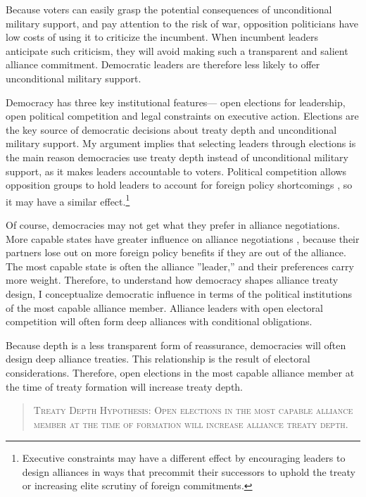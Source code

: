 \documentclass[12pt]{article}
\begin{document}
Because voters can easily grasp the potential consequences of unconditional military support, and pay attention to the risk of war, opposition politicians have low costs of using it to criticize the incumbent. 
When incumbent leaders anticipate such criticism, they will avoid making such a transparent and salient alliance commitment.
Democratic leaders are therefore less likely to offer unconditional military support. 


Democracy has three key institutional features--- open elections for leadership, open political competition and legal constraints on executive action. 
Elections are the key source of democratic decisions about treaty depth and unconditional military support. 
My argument implies that selecting leaders through elections is the main reason democracies use treaty depth instead of unconditional military support, as it makes leaders accountable to voters. 
Political competition allows opposition groups to hold leaders to account for foreign policy shortcomings \citep{PotterBaum2014}, so it may have a similar effect.\footnote{Executive constraints may have a different effect by encouraging leaders to design alliances in ways that precommit their successors to uphold the treaty or increasing elite scrutiny of foreign commitments.} 


Of course, democracies may not get what they prefer in alliance negotiations. 
More capable states have greater influence on alliance negotiations \citep{Mattes2012}, because their partners lose out on more foreign policy benefits if they are out of the alliance.
The most capable state is often the alliance ''leader,'' and their preferences carry more weight. 
Therefore, to understand how democracy shapes alliance treaty design, I conceptualize democratic influence in terms of the political institutions of the most capable alliance member.
Alliance leaders with open electoral competition will often form deep alliances with conditional obligations. 


Because depth is a less transparent form of reassurance, democracies will often design deep alliance treaties. 
This relationship is the result of electoral considerations. 
Therefore, open elections in the most capable alliance member at the time of treaty formation will increase treaty depth. 

\begin{quote}
\textsc{Treaty Depth Hypothesis: Open elections in the most capable alliance member at the time of formation will increase alliance treaty depth.}
\end{quote}   
\end{document}
